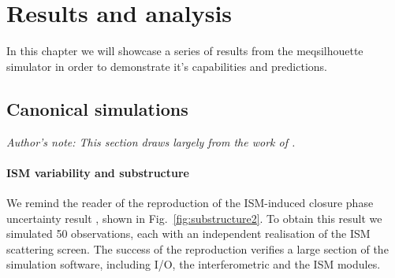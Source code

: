 \chapter{Results and analysis}
In this chapter we will showcase a series of results from the {\sc meqsilhouette} simulator in order to demonstrate it's capabilities and predictions.


\section{Canonical simulations}\label{sec:can_sim}
{\it Author's note: This section draws largely from the work of \citet{Blecher_2016}.}

\subsubsection{ISM variability and substructure}
We remind the reader of the reproduction of the ISM-induced closure phase uncertainty result \citep{Ortiz_2016}, shown in Fig.~\ref{fig:substructure2}. To obtain this result we simulated 50 observations, each with an independent realisation of the ISM scattering screen. The success of the reproduction verifies a large section of the simulation software, including I/O, the interferometric and the ISM modules. 

